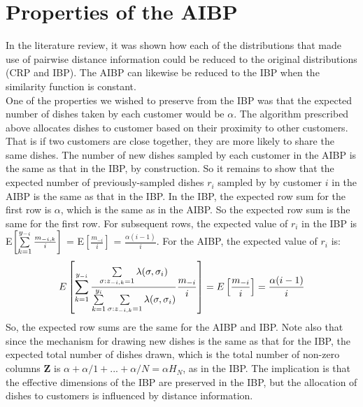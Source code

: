 \section{Properties of the AIBP}
In the literature review, it was shown how each of the distributions that made
use of pairwise distance information could be reduced to the original
distributions (CRP and IBP). The AIBP can likewise be reduced to the IBP when
the similarity function is constant.\\
\noindent
One of the properties we wished to preserve from the IBP was that the expected
number of dishes taken by each customer would be $\alpha$. The algorithm
prescribed above allocates dishes to customer based on their proximity to other
customers.  That is if two customers are close together, they are more likely
to share the same dishes. The number of new dishes sampled by each customer in
the AIBP is the same as that in the IBP, by construction. So it remains to show
that the expected number of previously-sampled dishes $r_i$ sampled by by
customer $i$ in the AIBP is the same as that in the IBP. In the IBP, the
expected row sum for the first row is $\alpha$, which is the same as in the
AIBP. So the expected row sum is the same for the first row. For subsequent
rows, the expected value of $r_i$ in the IBP is E$\left[\sum\limits_{k=1}^{y_{-i}}
\frac{m_{-i,k}}{i}\right]$ = E$\left[\frac{m_{-i}}{i}\right]$ =
$\frac{\alpha(i-1)}{i}$. For the AIBP, the expected value of $r_i$ is:
\[
  E\left[\sum\limits_{k=1}^{y_{-i}}\displaystyle\frac{\sum\limits_{\sigma:z_{-i,k}=1}^{}\lambda(\sigma,\sigma_i)} {\sum\limits_{k=1}^{y_i}\sum\limits_{\sigma:z_{-i,k}=1}^{}\lambda(\sigma,\sigma_i)} \frac{m_{-i}}{i}\right] = 
  E\left[\frac{m_{-i}}{i}\right] = \frac{\alpha(i-1)}{i}
\]
So, the expected row sums are the same for the AIBP and IBP. Note also that
since the mechanism for drawing new dishes is the same as that for the IBP, the
expected total number of dishes drawn, which is the total number of non-zero
columns $\bm Z$ is $\alpha+\alpha/1+...+\alpha/N = \alpha H_N$, as in the IBP. 
The implication is that the effective dimensions of the IBP are preserved in the
IBP, but the allocation of dishes to customers is influenced by distance 
information.\\

